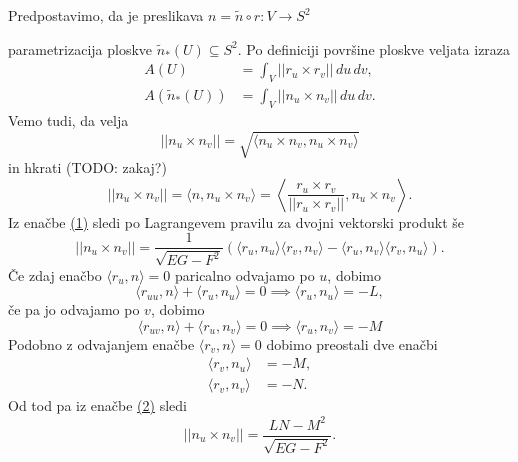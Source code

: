 Predpostavimo, da je preslikava $n = \tilde{n} \circ r: V \to S^2$ \begin{center}
\end{center}
parametrizacija ploskve $\tilde{n}_{*}(U) \subseteq S^2$. Po definiciji površine ploskve veljata izraza \begin{align*}
    A(U) &= \int_{V} \lvert\lvert r_u \times  r_v \rvert\rvert   \, du \, dv,  \\
    A(\tilde{n}_{*}(U)) &= \int_{V} \lvert\lvert n_u \times  n_v \rvert\rvert  \, du \, dv. 
\end{align*}
Vemo tudi, da velja \begin{equation*}\label{eq_1}
  \lvert\lvert n_u \times  n_v \rvert\rvert = \sqrt{\langle n_u \times n_v, n_u \times  n_v \rangle } 
\end{equation*}  
in hkrati (TODO: zakaj?) \begin{equation}
  \lvert\lvert n_u \times  n_v \rvert\rvert = \langle n, n_u \times n_v \rangle = \left\langle \frac{r_u \times r_v}{\lvert\lvert r_u \times  r_v \rvert\rvert } , n_u \times n_v \right\rangle .
\end{equation}  
Iz enačbe \href{eq_1}{(1)} sledi po Lagrangevem pravilu za dvojni vektorski produkt še \begin{equation} \label{eq_2}
  \lvert\lvert n_u \times  n_v \rvert\rvert = \frac{1}{\sqrt{EG - F^2} } (\langle r_u, n_u \rangle \langle r_v, n_v \rangle - \langle r_u, n_v \rangle \langle r_v, n_u \rangle  ).
\end{equation}  
Če zdaj enačbo $\langle r_u, n \rangle = 0$ paricalno odvajamo po $u$, dobimo \begin{equation*}
\langle r_{uu}, n \rangle + \langle r_u, n_u \rangle = 0 \implies \langle r_u, n_u \rangle = - L,  
\end{equation*}  
če pa jo odvajamo po $v$, dobimo \begin{equation*}
\langle r_{uv}, n \rangle + \langle r_u, n_v \rangle = 0 \implies  \langle r_u, n_v \rangle = - M
\end{equation*}  
Podobno z odvajanjem enačbe $\langle r_v, n \rangle = 0$ dobimo preostali dve enačbi \begin{align*}
  \langle r_v, n_u \rangle  &= - M, \\
  \langle r_v, n_v \rangle  &= - N.
\end{align*}
Od tod pa iz enačbe \href{eq_2}{(2)} sledi \begin{equation*}
  \lvert\lvert n_u \times  n_v \rvert\rvert = \frac{LN - M^2}{\sqrt{EG - F^2} }.
\end{equation*}  


